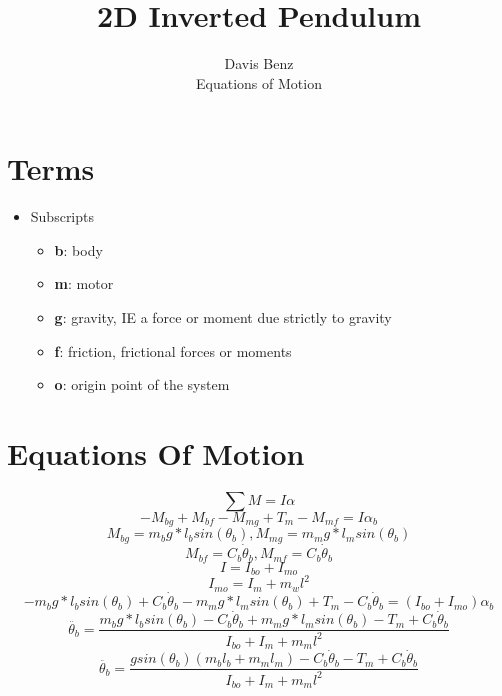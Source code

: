 \documentclass[12pt]{article}
\begin{document}
	
	\title{2D Inverted Pendulum}
	\author{Davis Benz\\
		    Equations of Motion}
	
	\maketitle
	
	\section{Terms}
		\begin{itemize}
			\item Subscripts
				\begin{itemize}
					\item \textbf{b}: body
					\item \textbf{m}: motor
					\item \textbf{g}: gravity, IE a force or moment due strictly to gravity
					\item \textbf{f}: friction, frictional forces or moments
					\item \textbf{o}: origin point of the system
				\end{itemize}
		\end{itemize}
	\section{Equations Of Motion}
		\begin{equation}
			\sum M = I\alpha
		\end{equation}
		\begin{equation}
			-M_{bg}+M_{bf}-M_{mg}+T_m-M_{mf} = I\alpha_b
		\end{equation}
		\begin{equation}
			M_{bg} = m_b g*l_b sin(\theta_b), M_{mg} = m_m g*l_msin(\theta_b)
		\end{equation}
		\begin{equation}
			M_{bf} = C_b \dot{\theta}_b, M_{mf} = C_b \dot{\theta}_b
		\end{equation}
		\begin{equation}
			I = I_{bo} + I_{mo}
		\end{equation}
		\begin{equation}
			I_{mo} = I_m+m_wl^2
		\end{equation}
		\begin{equation}
			-m_b g*l_b sin(\theta_b) + C_b \dot{\theta}_b - m_m g*l_msin(\theta_b) + T_m - C_b \dot{\theta}_b = (I_{bo}+I_{mo})\alpha_b
		\end{equation}
		\begin{equation}
			\ddot{\theta_b} = \frac{m_b g*l_b sin(\theta_b) - C_b \dot{\theta}_b + m_m g*l_msin(\theta_b) - T_m + C_b \dot{\theta}_b}{I_{bo}+I_m+m_ml^2}
		\end{equation}
		\begin{equation}
			\ddot{\theta_b} = \frac{gsin(\theta_b)(m_bl_b + m_ml_m) - C_b \dot{\theta}_b - T_m + C_b \dot{\theta}_b}{I_{bo}+I_m+m_ml^2}
		\end{equation}
		
	
	
\end{document}
